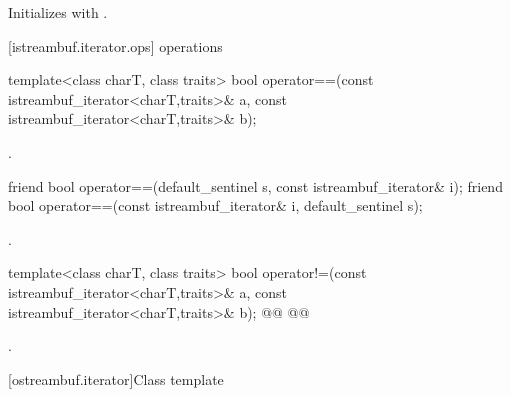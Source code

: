 \begin{itemdescr}
\pnum
\effects
Initializes  with .
\end{itemdescr}


[istreambuf.iterator.ops]{ operations}


\setcounter{Paras}{5}
%
\begin{itemdecl}
template<class charT, class traits>
  bool operator==(const istreambuf_iterator<charT,traits>& a,
                  const istreambuf_iterator<charT,traits>& b);
\end{itemdecl}

\begin{itemdescr}
\pnum
\returns
{}.
\end{itemdescr}

\begin{addedblock}
%
\begin{itemdecl}
friend bool operator==(default_sentinel s, const istreambuf_iterator& i);
friend bool operator==(const istreambuf_iterator& i, default_sentinel s);
\end{itemdecl}

\begin{itemdescr}
\pnum
\returns
{}.
\end{itemdescr}
\end{addedblock}

%
\begin{itemdecl}
template<class charT, class traits>
  bool operator!=(const istreambuf_iterator<charT,traits>& a,
                  const istreambuf_iterator<charT,traits>& b);
@@
@@
\end{itemdecl}

\begin{itemdescr}
\pnum
\returns
{}.
\end{itemdescr}



[ostreambuf.iterator]{Class template }

